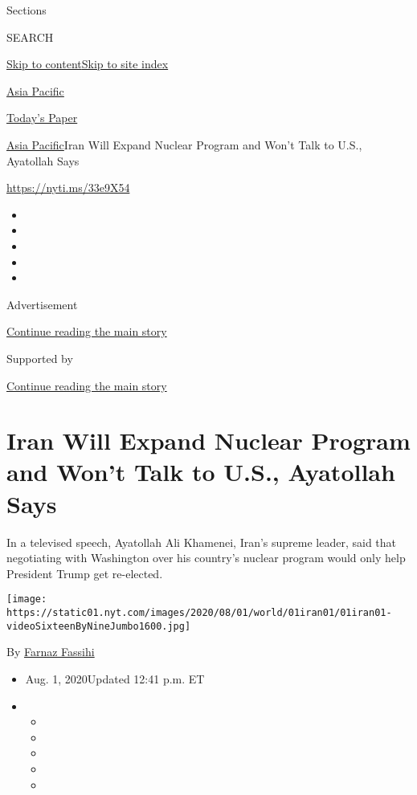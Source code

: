 Sections

SEARCH

\protect\hyperlink{site-content}{Skip to
content}\protect\hyperlink{site-index}{Skip to site index}

\href{https://www.nytimes.com/section/world/asia}{Asia Pacific}

\href{https://myaccount.nytimes.com/auth/login?response_type=cookie\&client_id=vi}{}

\href{https://www.nytimes.com/section/todayspaper}{Today's Paper}

\href{/section/world/asia}{Asia Pacific}\textbar{}Iran Will Expand
Nuclear Program and Won't Talk to U.S., Ayatollah Says

\url{https://nyti.ms/33e9X54}

\begin{itemize}
\item
\item
\item
\item
\item
\end{itemize}

Advertisement

\protect\hyperlink{after-top}{Continue reading the main story}

Supported by

\protect\hyperlink{after-sponsor}{Continue reading the main story}

\hypertarget{iran-will-expand-nuclear-program-and-wont-talk-to-us-ayatollah-says}{%
\section{Iran Will Expand Nuclear Program and Won't Talk to U.S.,
Ayatollah
Says}\label{iran-will-expand-nuclear-program-and-wont-talk-to-us-ayatollah-says}}

In a televised speech, Ayatollah Ali Khamenei, Iran's supreme leader,
said that negotiating with Washington over his country's nuclear program
would only help President Trump get re-elected.

\texttt{[image: https://static01.nyt.com/images/2020/08/01/world/01iran01/01iran01-videoSixteenByNineJumbo1600.jpg]}

By \href{https://www.nytimes.com/by/farnaz-fassihi}{Farnaz Fassihi}

\begin{itemize}
\item
  Aug. 1, 2020Updated 12:41 p.m. ET
\item
  \begin{itemize}
  \item
  \item
  \item
  \item
  \item
  \end{itemize}
\end{itemize}


